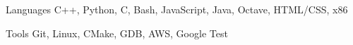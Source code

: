

\begin{cvskills}

  \vspace{2mm}\cvskill
    {Languages} %
    {C++, Python, C, Bash, JavaScript, Java, Octave, HTML/CSS, x86}

  \vspace{-3mm}\cvskill
    {Tools} %
    {Git, Linux, CMake, GDB, AWS, Google Test}

\end{cvskills}
